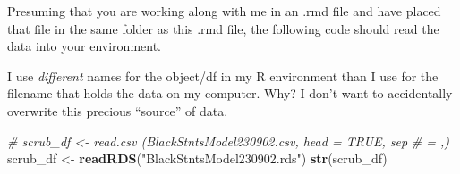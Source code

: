 \documentclass[
  11pt,
]{book}
\newenvironment{Shaded}{\begin{snugshade}}{\end{snugshade}}
\newcommand{\CommentTok}[1]{\textcolor[rgb]{0.37,0.37,0.37}{\textit{#1}}}
\newcommand{\FunctionTok}[1]{\textcolor[rgb]{0.27,0.27,0.27}{\textbf{#1}}}
\newcommand{\NormalTok}[1]{#1}
\newcommand{\OtherTok}[1]{\textcolor[rgb]{0.37,0.37,0.37}{#1}}
\newcommand{\StringTok}[1]{\textcolor[rgb]{0.5,0.5,0.5}{#1}}
\begin{document}
Presuming that you are working along with me in an .rmd file and have placed that file in the same folder as this .rmd file, the following code should read the data into your environment.

I use \emph{different} names for the object/df in my R environment than I use for the filename that holds the data on my computer. Why? I don't want to accidentally overwrite this precious ``source'' of data.

\begin{Shaded}
\begin{Highlighting}[]
\CommentTok{\# scrub\_df \textless{}{-} read.csv (\textquotesingle{}BlackStntsModel230902.csv\textquotesingle{}, head = TRUE, sep}
\CommentTok{\# = \textquotesingle{},\textquotesingle{})}
\NormalTok{scrub\_df }\OtherTok{\textless{}{-}} \FunctionTok{readRDS}\NormalTok{(}\StringTok{"BlackStntsModel230902.rds"}\NormalTok{)}
\FunctionTok{str}\NormalTok{(scrub\_df)}
\end{Highlighting}
\end{Shaded}
\end{document}
